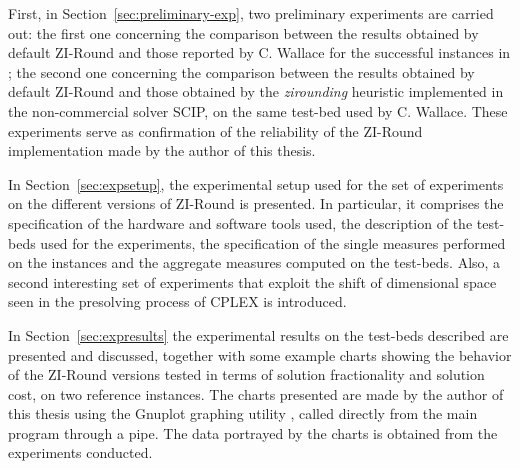 \documentclass[a4paper,12pt]{book}
\begin{document}
First, in Section~\ref{sec:preliminary-exp}, two preliminary experiments are carried out: the first one concerning the comparison between the results obtained by default ZI-Round and those reported by C. Wallace  for the successful instances in \cite{wallace2010}; the second one concerning the comparison between the results obtained by default ZI-Round and those obtained by the \textit{zirounding} heuristic implemented in the non-commercial solver SCIP, on the same test-bed used by C. Wallace. These experiments serve as confirmation of the reliability of the ZI-Round implementation made by the author of this thesis. \par

In Section~\ref{sec:expsetup}, the experimental setup used for the set of experiments on the different versions of ZI-Round is presented. In particular, it comprises the specification of the hardware and software tools used, the description of the test-beds used for the experiments, the specification of the single measures performed on the instances and the aggregate measures computed on the test-beds. Also, a second interesting set of experiments that exploit the shift of dimensional space seen in the presolving process of CPLEX is introduced. \par 

In Section~\ref{sec:expresults} the experimental results on the test-beds described are presented and discussed, together with some example charts showing the behavior of the ZI-Round versions tested in terms of solution fractionality and solution cost, on two reference instances. The charts presented are made by the author of this thesis using the Gnuplot graphing utility \cite{gnuplot}, called directly from the main program through a pipe. The data portrayed by the charts is obtained from the experiments conducted.
\end{document}
